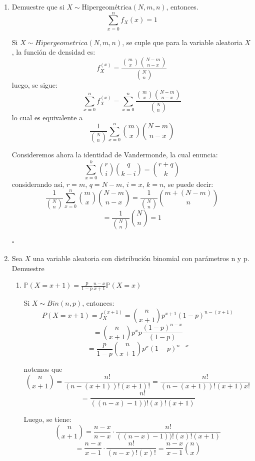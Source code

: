 \documentclass[11pt,a4paper]{report}
\begin{document}
\begin{enumerate}
{		}

		\item{
			Demuestre que si $X \sim \text{Hipergeométrica}(N,m,n)$, entonces.
				$$ \sum_{x = 0}^{n}f_X(x) = 1$$

			Si $X \sim Hipergeometrica(N, m, n)$, se cuple que para la variable
			aleatoria $X$, la función de densidad es:
				$$ f_X^{(x)} = \frac{{m \choose x} {N-m \choose n-x} }
							   {{N \choose n}} $$
			luego, se sigue:
				$$ \sum_{x = 0}^{n} f_X^{(x)} = \sum_{x = 0}^{n}
				   \frac{{m \choose x} {N-m \choose n-x} } {{N \choose n}}$$
			lo cual es equivalente a
				$$ \frac{1}{{N \choose n}} \sum_{x = 0}^{n}
				   {m \choose x} {N-m \choose n-x}$$

			Consideremos ahora la identidad de Vandermonde, la cual enuncia:
				$$ \sum_{x = 0}^{k} {r \choose i} {q \choose k - i}
				   = {r + q \choose k}$$
			considerando así, $r = m$, $q = N-m$, $i = x$, $k = n$, se puede
			decir:
				$$ \frac{1}{{N \choose n}} \sum_{x = 0}^{n} {m \choose x}
				  {N-m \choose n-x} = \frac{1}{{N \choose n}}
				  {m + (N-m) \choose n} $$
				$$ = \frac{1}{{N \choose n}} {N \choose n} = 1 $$
									 						  \begin{flushright}
															  	$\square$
										         			  \end{flushright}
		}

		\item{
			Sea $X$ una variable aleatoria con distribución binomial con
			parámetros n y p. Demuestre
			\begin{enumerate}
				\item {
					$\mathbb{P}(X = x + 1) = \frac{p}{1 - p} \frac{n - x}{x + 1}
					 \mathbb{P}(X = x)$

					Si $X \sim Bin(n, p)$, entonces:
						$$ P(X = x + 1) = f_X^{(x + 1)}
						   = {n \choose x + 1}p^{x+1}(1-p)^{n - (x + 1) }  $$
						$$ = {n \choose x + 1}p^xp
							 \frac{(1-p)^{n - x}}{(1 - p)} $$
						$$ = \frac{p}{1 - p}{n \choose x + 1}p^x (1-p)^{n - x}$$

					notemos que
						$$ {n \choose x + 1} = \frac{n!}{(n-(x +1))! (x+1)!}
					      = \frac{n!}{(n-(x +1))! (x+1)x!}$$
						$$ = \frac{n!}{((n- x) - 1))! (x)! (x+1)} $$

					Luego, se tiene:
						$$ {n \choose x + 1} = \frac{n - x}{n - x} \cdot
						   \frac{n!}{((n- x) - 1))! (x)! (x+1)}
						   $$
						$$ = \frac{n - x}{x - 1} \cdot \frac{n!}{(n-x)! (x)!}
						   = \frac{n - x}{x - 1} {n \choose x} $$

}
\end{enumerate}}
\end{enumerate}
\end{document}
